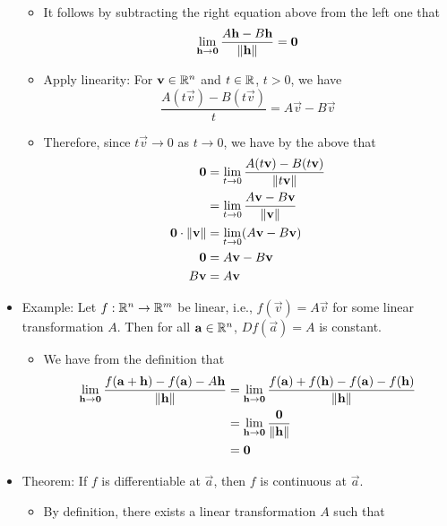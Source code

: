 \documentclass[../notes.tex]{subfiles}
\begin{document}
\begin{itemize}
\begin{itemize}
        \item It follows by subtracting the right equation above from the left one that
        \begin{equation*}
            \lim_{\mathbf{h}\to\bm{0}}\frac{A\mathbf{h}-B\mathbf{h}}{\norm{\mathbf{h}}} = \bm{0}
        \end{equation*}
        \item Apply linearity: For $\mathbf{v}\in\mathbb{R}^n$ and $t\in\mathbb{R}$, $t>0$, we have
        \begin{equation*}
            \frac{A(t\vec{v})-B(t\vec{v})}{t} = A\vec{v}-B\vec{v}
        \end{equation*}
        \item Therefore, since $t\vec{v}\to 0$ as $t\to 0$, we have by the above that
        \begin{align*}
            \bm{0} &= \lim_{t\to 0}\frac{A(t\mathbf{v})-B(t\mathbf{v})}{\norm{t\mathbf{v}}}\\
            &= \lim_{t\to 0}\frac{A\mathbf{v}-B\mathbf{v}}{\norm{\mathbf{v}}}\\
            \bm{0}\cdot\norm{\mathbf{v}} &= \lim_{t\to 0}(A\mathbf{v}-B\mathbf{v})\\
            \bm{0} &= A\mathbf{v}-B\mathbf{v}\\
            B\mathbf{v} &= A\mathbf{v}
        \end{align*}
    \end{itemize}
    \item Example: Let $f:\mathbb{R}^n\to\mathbb{R}^m$ be linear, i.e., $f(\vec{v})=A\vec{v}$ for some linear transformation $A$. Then for all $\mathbf{a}\in\mathbb{R}^n$, $Df(\vec{a})=A$ is constant.
    \begin{itemize}
        \item We have from the definition that
        \begin{align*}
            \lim_{\mathbf{h}\to\bm{0}}\frac{f(\mathbf{a}+\mathbf{h})-f(\mathbf{a})-A\mathbf{h}}{\norm{\mathbf{h}}} &= \lim_{\mathbf{h}\to\bm{0}}\frac{f(\mathbf{a})+f(\mathbf{h})-f(\mathbf{a})-f(\mathbf{h})}{\norm{\mathbf{h}}}\\
            &= \lim_{\mathbf{h}\to\bm{0}}\frac{\bm{0}}{\norm{\mathbf{h}}}\\
            &= \bm{0}
        \end{align*}
    \end{itemize}
    \item Theorem: If $f$ is differentiable at $\vec{a}$, then $f$ is continuous at $\vec{a}$.
    \begin{itemize}
        \item By definition, there exists a linear transformation $A$ such that

\end{itemize}
\end{itemize}
\end{document}
